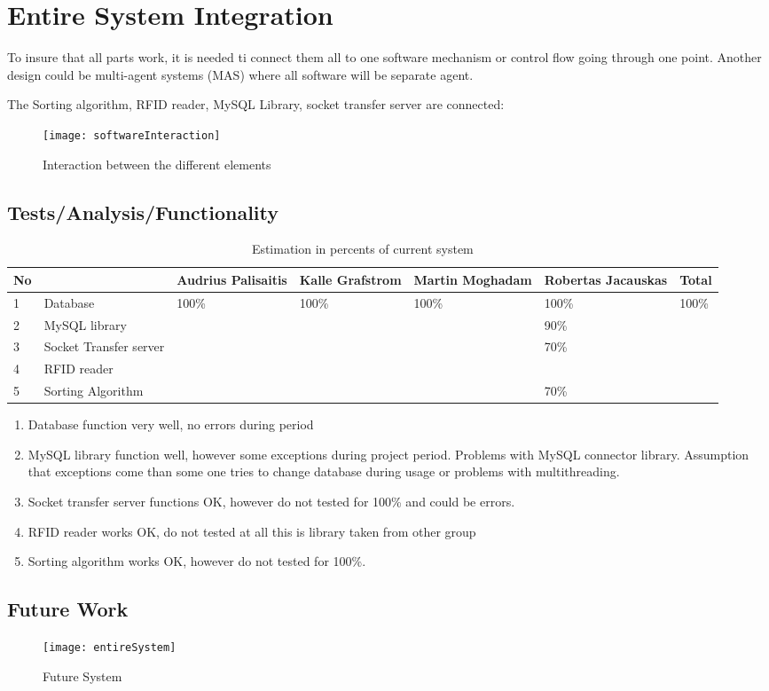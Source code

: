 %
\section{Entire System Integration}

To insure that all parts work, it is needed ti connect them all to one software mechanism or control flow going through one point. Another design could be multi-agent systems (MAS) where all software will be separate agent.

The Sorting algorithm, RFID reader, MySQL Library, socket transfer server are connected:

\begin{figure}[h]
	\centering
		\texttt{[image: softwareInteraction]}
	\caption{Interaction between the different elements}
	\label{fig:softwareInteraction}
\end{figure}


\subsection{Tests/Analysis/Functionality}

\begin{table}[h]
	
    \begin{tabular}{ | p{0.5cm} | p{3.8cm} | p{1.6cm} | p{1.8cm} |p{1.6cm} |p{1.7cm} |p{1cm} |}
    \hline
	No &  & Audrius Palisaitis & Kalle Grafstrom & Martin Moghadam & Robertas Jacauskas & Total\\ \hline
	1 & Database & 100\% & 100\% & 100\% & 100\% & 100\% \\ \hline
	2 & MySQL library &  &  &  & 90\% &  \\ \hline
	3 & Socket Transfer server &  &  &  & 70\% &  \\ \hline
	4 & RFID reader &  &  &  &  &  \\ \hline
	5 & Sorting Algorithm &  &  &  & 70\% &  \\ \hline
    \end{tabular}
	\caption{Estimation in percents of current system}
	\label{tab:percentSystem}
\end{table}

\begin{enumerate}
	\item Database function very well, no errors during period
	\item MySQL library function well, however some exceptions during project period. Problems with MySQL connector library. Assumption that exceptions come than some one tries to change database during usage or problems with multithreading.
	\item Socket transfer server functions OK, however do not tested for 100\% and could be errors.
	\item RFID reader works OK, do not tested at all this is library taken from other group
	\item Sorting algorithm works OK, however do not tested for 100\%.
\end{enumerate}

\subsection{Future Work}

\begin{figure}[h]
	\centering
		\texttt{[image: entireSystem]}
	\caption{Future System}
	\label{fig:entireSystem}
\end{figure}